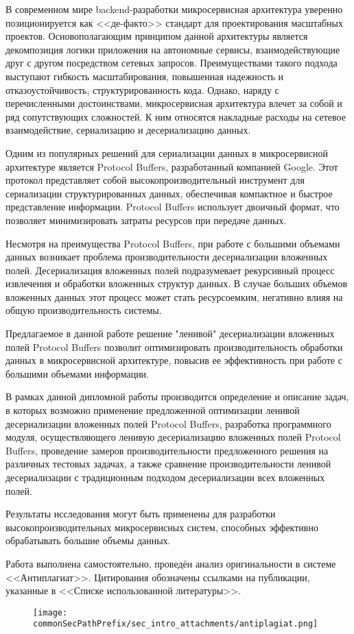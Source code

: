 
В современном мире backend-разработки микросервисная архитектура уверенно позиционируется как <<де-факто>> стандарт для проектирования масштабных проектов. Основополагающим принципом данной архитектуры является декомпозиция логики приложения на автономные сервисы, взаимодействующие друг с другом посредством сетевых запросов. Преимуществами такого подхода выступают гибкость масштабирования, повышенная надежность и отказоустойчивость, структурированность кода.
Однако, наряду с перечисленными достоинствами, микросервисная архитектура влечет за собой и ряд сопутствующих сложностей. К ним относятся накладные расходы на сетевое взаимодействие, сериализацию и десериализацию данных.

Одним из популярных решений для сериализации данных в микросервисной архитектуре является Protocol Buffers, разработанный компанией Google. Этот протокол представляет собой высокопроизводительный инструмент для сериализации структурированных данных, обеспечивая компактное и быстрое представление информации. Protocol Buffers использует двоичный формат, что позволяет минимизировать затраты ресурсов при передаче данных.

Несмотря на преимущества Protocol Buffers, при работе с большими объемами данных возникает проблема производительности десериализации вложенных полей. Десериализация вложенных полей подразумевает рекурсивный процесс извлечения и обработки вложенных структур данных. В случае больших объемов вложенных данных этот процесс может стать ресурсоемким, негативно влияя на общую производительность системы.

Предлагаемое в данной работе решение "ленивой" десериализации вложенных полей Protocol Buffers позволит оптимизировать производительность обработки данных в микросервисной архитектуре, повысив ее эффективность при работе с большими объемами информации.

В рамках данной дипломной работы производится определение и описание задач, в которых возможно применение предложенной оптимизации ленивой десериализации вложенных полей Protocol Buffers, разработка программного модуля, осуществляющего ленивую десериализацию вложенных полей Protocol Buffers, проведение замеров производительности предложенного решения на различных тестовых задачах, а также сравнение производительности ленивой десериализации с традиционным подходом десериализации всех вложенных полей.

Результаты исследования могут быть применены для разработки высокопроизводительных микросервисных систем, способных эффективно обрабатывать большие объемы данных.

Работа выполнена самостоятельно, проведён анализ оригинальности в системе <<Антиплагиат>>. Цитирования обозначены ссылками на публикации, указанные в <<Списке использованной литературы>>.

\begin{figure}[ht]
    \centering
    \texttt{[image: \\commonSecPathPrefix/sec\_intro\_attachments/antiplagiat.png]}
\end{figure}
